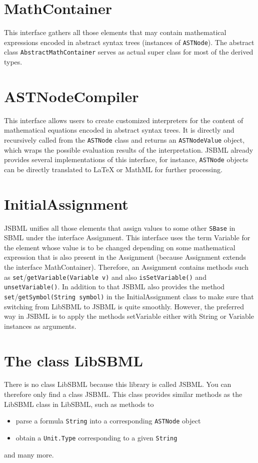 \documentclass[a4paper,11pt]{scrartcl}
\begin{document}
\section{MathContainer}

This interface gathers all those elements that may contain mathematical
expressions encoded in abstract syntax trees (instances of \verb!ASTNode!).
The abstract class \verb!AbstractMathContainer! serves as actual super class
for most of the derived types.

\section{ASTNodeCompiler}

This interface allows users to create customized interpreters for the
content of mathematical equations encoded in abstract syntax trees. It
is directly and recursively called from the \verb!ASTNode! class and returns
an \verb!ASTNodeValue! object, which wraps the possible evaluation results of
the interpretation. JSBML already provides several implementations of
this interface, for instance, \verb!ASTNode! objects can be directly translated
to LaTeX or MathML for further processing.

\section{InitialAssignment}

JSBML unifies all those elements that assign values to some other 
\verb!SBase! in SBML under the interface Assignment. This interface uses
the term Variable for the element whose value is to be changed depending
on some mathematical expression that is also present in the Assignment
(because Assignment extends the interface MathContainer). Therefore,
an Assignment contains methods such as \verb!set!/\verb!getVariable(Variable v)!
and also \verb!isSetVariable()! and \verb!unsetVariable()!. In addition to that
JSBML also provides the method \verb!set!/\verb!getSymbol(String symbol)! in the
InitialAssignment class to make sure that switching from LibSBML to
JSBML is quite smoothly. However, the preferred way in JSBML is to
apply the methods setVariable either with String or Variable instances
as arguments.
 

\section{The class LibSBML}

There is no class LibSBML because this library is called JSBML. You
can therefore only find a class JSBML. This class provides similar
methods as the LibSBML class in LibSBML, such as methods to
\begin{itemize}
 \item parse a formula \verb!String! into a corresponding \verb!ASTNode! object
 \item obtain a \verb!Unit.Type! corresponding to a given \verb!String!
\end{itemize}
and many more.
\end{document}
